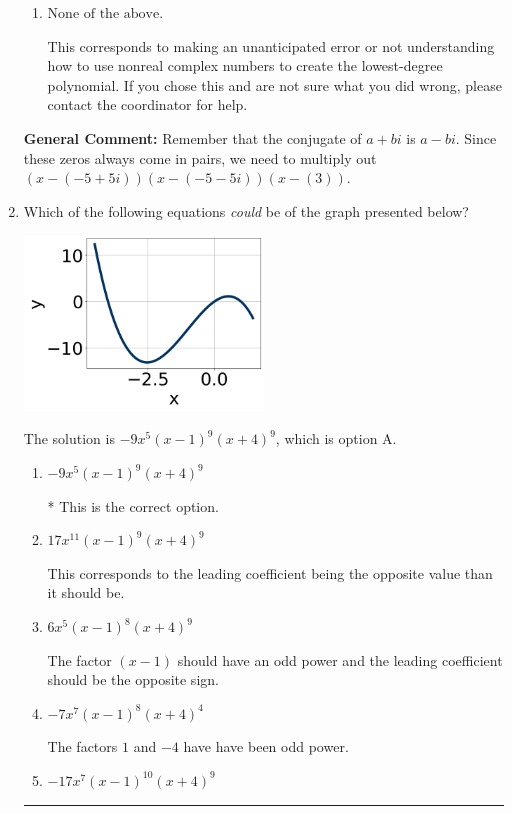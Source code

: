 \documentclass{extbook}[14pt]
\newcommand{\litem}[1]{\item #1

\rule{\textwidth}{0.4pt}}
\begin{document}
\begin{enumerate}
{\begin{enumerate}[label=\Alph*.]
$x^{3} + x^{2} -8 x + 15$, which corresponds to multiplying out $(x -5)(x -3)$.
\item \( \text{None of the above.} \)

This corresponds to making an unanticipated error or not understanding how to use nonreal complex numbers to create the lowest-degree polynomial. If you chose this and are not sure what you did wrong, please contact the coordinator for help.
\end{enumerate}

\textbf{General Comment:} Remember that the conjugate of $a+bi$ is $a-bi$. Since these zeros always come in pairs, we need to multiply out $(x-(-5 + 5 i))(x-(-5 - 5 i))(x-(3))$.
}
\litem{
Which of the following equations \textit{could} be of the graph presented below?

\begin{center}
    \includegraphics[width=0.5\textwidth]{../Figures/polyGraphToFunctionB.png}
\end{center}


The solution is \( -9x^{5} (x - 1)^{9} (x + 4)^{9} \), which is option A.\begin{enumerate}[label=\Alph*.]
\item \( -9x^{5} (x - 1)^{9} (x + 4)^{9} \)

* This is the correct option.
\item \( 17x^{11} (x - 1)^{9} (x + 4)^{9} \)

This corresponds to the leading coefficient being the opposite value than it should be.
\item \( 6x^{5} (x - 1)^{8} (x + 4)^{9} \)

The factor $(x - 1)$ should have an odd power and the leading coefficient should be the opposite sign.
\item \( -7x^{7} (x - 1)^{8} (x + 4)^{4} \)

The factors $1$ and $-4$ have have been odd power.
\item \( -17x^{7} (x - 1)^{10} (x + 4)^{9} \)


\end{enumerate}}
\end{enumerate}
\end{document}
